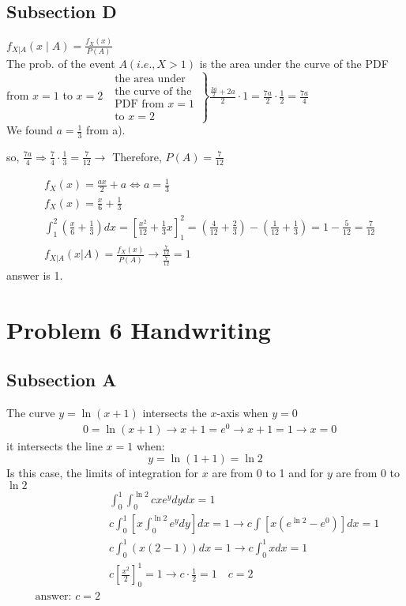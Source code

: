 \documentclass[a4paper,11pt]{article}
\theoremstyle{mytheor}
\begin{document}
\subsection{Subsection D}
$f_{X | A}(x \mid A)=\frac{f_X(x)}{P(A)}$\\

The prob. of the event $A(i.e., X>1)$ is the area under the curve of the PDF from $x=1$ to $x=2$
$\left.\begin{array}{l}\text { the area under } \\ \text { the curve of the } \\ \text { PDF from } x=1 \\ \text { to } x=2 \end{array}\right\} \frac{\frac{3 a}{2}+2 a}{2} \cdot 1=\frac{7 a}{2} \cdot \frac{1}{2} = \frac{7 a}{4}$ \\

We found $a=\frac{1}{3}$ from a).

so, $\frac{7 a}{4} \Rightarrow \frac{7}{4} \cdot \frac{1}{3}=\frac{7}{12} \rightarrow$ Therefore, $P(A)=\frac{7}{12}$

$$
\begin{aligned}
&f_X(x)=\frac{a x}{2}+a \Longleftrightarrow a=\frac{1}{3} \\
&f_X(x)=\frac{x}{6}+\frac{1}{3} \\
&\int_1^2\left(\frac{x}{6}+\frac{1}{3}\right) d x=\left[\frac{x^2}{12}+\frac{1}{3} x\right]_1^2=\left(\frac{4}{12}+\frac{2}{3}\right)-\left(\frac{1}{12}+\frac{1}{3}\right)=1-\frac{5}{12}=\frac{7}{12} \\
&f_{X | A}(x | A)=\frac{f_X(x)}{P(A)} \rightarrow \frac{\frac{7}{12}}{\frac{7}{12}}=1
\end{aligned}
$$
answer is 1.

\newpage
\section{Problem 6 Handwriting}
\subsection{Subsection A}

The curve $y=\ln (x+1)$ intersects the $x$-axis when $y=0$
$$
\begin{aligned}
& 0=\ln (x+1)\rightarrow x+1=e^0 \rightarrow x+1=1 \rightarrow x=0
\end{aligned}
$$
it intersects the line $x=1$ when:
$$
y=\ln (1+1)=\ln 2
$$
Is this case, the limits of integration for $x$ are from 0 to 1 and for $y$ are from 0 to $\ln 2$
$$
\begin{aligned}
& \int_0^1 \int_0^{\ln 2} c x e^y d y d x=1 \\
& c \int_0^1\left[x \int_0^{\ln 2} e^y d y\right] d x=1 \rightarrow c \int\left[x\left(e^{\ln 2}-e^0\right)\right] d x=1 \\
& c \int_0^1(x(2-1)) d x=1 \rightarrow c \int_0^1 x d x=1 \\
& c\left[\frac{x^2}{2}\right]_0^1=1 \rightarrow c \cdot \frac{1}{2}=1 \quad c=2 \quad \\
\text { answer: } c=2
\end{aligned}
$$
\end{document}
